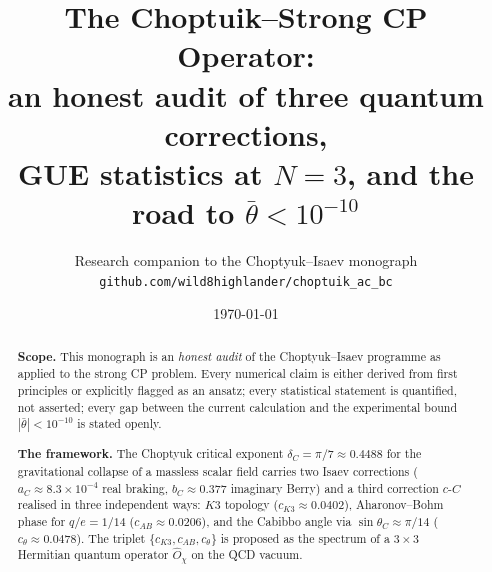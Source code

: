 \documentclass[11pt,a4paper]{article}
\title{\vspace{-1.0cm}\textbf{The Choptuik--Strong CP Operator:\\
an honest audit of three quantum corrections,\\
GUE statistics at $N=3$, and the road to $\bar\theta < 10^{-10}$}}
\author{Research companion to the Choptyuk--Isaev monograph\\
\small\texttt{github.com/wild8highlander/choptuik\_ac\_bc}}
\date{\today}
\newcommand{\dC}{\delta_C}
\newcommand{\cC}{c\text{-}C}
\newcommand{\Opchi}{\hat{O}_\chi}
\theoremstyle{plain}
\theoremstyle{definition}
\theoremstyle{remark}
\begin{document}
\maketitle

\begin{abstract}
\noindent
\textbf{Scope.}  This monograph is an \emph{honest audit} of the
Choptyuk--Isaev programme as applied to the strong CP problem.  Every
numerical claim is either derived from first principles or explicitly
flagged as an ansatz; every statistical statement is quantified, not
asserted; every gap between the current calculation and the experimental
bound $|\bar\theta| < 10^{-10}$ is stated openly.

\smallskip
\textbf{The framework.}  The Choptyuk critical exponent
$\dC = \pi/7 \approx 0.4488$ for the gravitational collapse of a massless
scalar field carries two Isaev corrections ($a_C \approx 8.3\times
10^{-4}$ real braking, $b_C \approx 0.377$ imaginary Berry) and a third
correction $\cC$ realised in three independent ways: $K3$ topology
($c_{K3} \approx 0.0402$), Aharonov--Bohm phase for $q/e = 1/14$
($c_{AB} \approx 0.0206$), and the Cabibbo angle via $\sin\theta_C
\approx \pi/14$ ($c_\theta \approx 0.0478$).  The triplet
$\{c_{K3}, c_{AB}, c_\theta\}$ is proposed as the spectrum of a
$3\times 3$ Hermitian quantum operator $\Opchi$ on the QCD vacuum.


\end{abstract}
\end{document}
